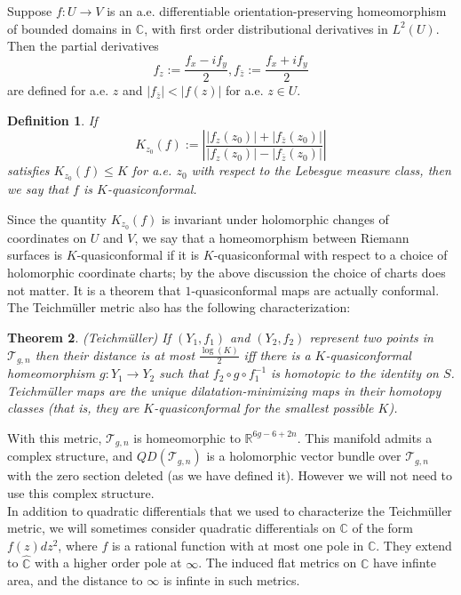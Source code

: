 \documentclass[12pt]{article}
\newtheorem{theorem}{Theorem}[section]
\newtheorem{definition}[theorem]{Definition}
\newcommand{\rr}{\mathbb{R}}
\newcommand{\cc}{\mathbb{C}}
\begin{document}
\noindent Suppose $f: U \to V$ is an a.e. differentiable orientation-preserving homeomorphism of bounded domains in $\cc$, with first order distributional derivatives in $L^2(U)$. Then the partial derivatives $$f_z := \frac{f_x - i f_y}{2}, f_{\bar{z}} := \frac{f_x + i f_y}{2}$$ are defined for a.e. $z$ and $|f_{\bar{z}}| < |f(z)|$ for a.e. $z \in U$.

\begin{definition}If $$K_{z_0}(f) := \left|\frac{|f_z(z_0)| + |f_{\bar{z}}(z_0)|}{|f_z(z_0)| - |f_{\bar{z}}(z_0)|}\right|$$ satisfies $K_{z_0}(f) \leq K$ for a.e. $z_0$ with respect to the Lebesgue measure class, then we say that $f$ is $K$-quasiconformal.\end{definition}

\noindent Since the quantity $K_{z_0}(f)$ is invariant under holomorphic changes of coordinates on $U$ and $V$, we say that a homeomorphism between Riemann surfaces is $K$-quasiconformal if it is $K$-quasiconformal with respect to a choice of holomorphic coordinate charts; by the above discussion the choice of charts does not matter. It is a theorem that $1$-quasiconformal maps are actually conformal.\\

\noindent The Teichm\"uller metric also has the following characterization:

\begin{theorem} (Teichm\"{u}ller) If $(Y_1,f_1)$ and $(Y_2,f_2)$ represent two points in $\mathcal{T}_{g,n}$ then their distance is at most $\frac{\log(K)}{2}$ iff there is a $K$-quasiconformal homeomorphism $g: Y_1 \to Y_2$ such that $f_2 \circ g \circ f_1^{-1}$ is homotopic to the identity on $S$. Teichm\"{u}ller maps are the unique dilatation-minimizing maps in their homotopy classes (that is, they are $K$-quasiconformal for the smallest possible $K$).\end{theorem}

\noindent With this metric, $\mathcal{T}_{g,n}$ is homeomorphic to $\rr^{6g-6+2n}$. This manifold admits a complex structure, and $QD(\mathcal{T}_{g,n})$ is a holomorphic vector bundle over $\mathcal{T}_{g,n}$ with the zero section deleted (as we have defined it). However we will not need to use this complex structure.\\

\noindent In addition to quadratic differentials that we used to characterize the Teichm\"uller metric, we will sometimes consider quadratic differentials on $\cc$ of the form $f(z)dz^2$, where $f$ is a rational function with at most one pole in $\cc$. They extend to $\hat{\cc}$ with a higher order pole at $\infty$. The induced flat metrics on $\cc$ have infinte area, and the distance to $\infty$ is infinte in such metrics.\\
\end{document}
